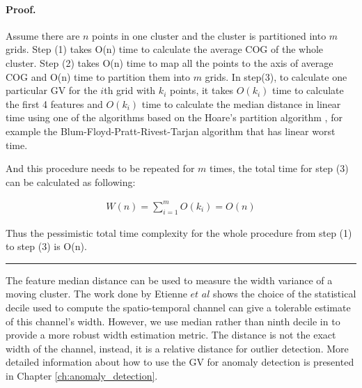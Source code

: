 \documentclass[12pt,glossary]{dalcsthesis}
\newenvironment{proof}{\paragraph{Proof.}}
{\nopagebreak\hfill\nopagebreak\rule{2mm}{2mm}\par\bigskip}
\begin{document}
\begin{proof}
Assume there are $n$ points in one cluster and the cluster is partitioned into $m$ grids. Step (1) takes O(n) time to calculate the average COG of the whole cluster. Step (2) takes O(n) time to map all the points to the axis of average COG and O(n) time to partition them into $m$ grids. In step(3), to calculate one particular GV for the $i$th grid with $k_i$ points, it takes $O(k_i)$ time to calculate the first 4 features and 
$O(k_i)$
time to calculate the median distance 
%
in linear time using one of the algorithms based on the Hoare's partition algorithm \cite{hoare:partition-cacm62}, for example the Blum-Floyd-Pratt-Rivest-Tarjan algorithm \cite{blum:linearSelection-jcss73} that has linear worst time.
 
And this procedure needs to be repeated for $m$ times, the total time for step (3) can be calculated as following:

\begin{eqnarray*}
W(n) = \sum_{i=1}^m O(k_i) = O(n)
\end{eqnarray*} 

 
Thus the pessimistic total time complexity for the whole procedure from step (1) to step (3) is 
O(n).

\end{proof}

The feature median distance can be used to measure the width variance of a moving cluster. The work done by Etienne $et$ $al$ \cite{Etienne12} shows the choice of the statistical decile used to compute the spatio-temporal channel can give a tolerable estimate of this channel's width. However, we use median rather than ninth decile in \cite{Etienne12} to provide a more robust width estimation metric. The distance is not the exact width of the channel, instead, it is a relative distance for outlier detection. More detailed information about how to use the GV for anomaly detection is presented in Chapter \ref{ch:anomaly_detection}.
\end{document}
